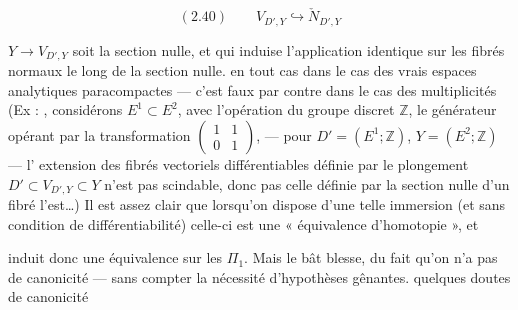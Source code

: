 \documentclass[11pt,a4paper]{article}
\begin{document}
\[
(2.40)\qquad V_{D',Y}\hookrightarrow \check N_{D',Y}
\]

  $Y\to V_{D',Y}$ soit la section nulle, et qui induise l'application identique sur les  fibrés normaux le long de la section nulle.   en tout cas dans le cas des vrais espaces analytiques paracompactes — c'est faux par contre dans le cas des multiplicités (Ex : , considérons $E^1\subset E^2$, avec l'opération du groupe discret $\mathbb Z$,  le générateur opérant par la transformation $\begin{pmatrix}1&1\\0&1\end{pmatrix}$, — pour $D'=(E^1;\mathbb Z)$, $Y=(E^2;\mathbb Z)$ — l' extension des fibrés vectoriels différentiables définie par le plongement $D'\subset V_{D',Y}\subset Y$ n'est pas scindable, donc pas celle définie par la section nulle d'un fibré l'est\ldots) Il est assez clair que lorsqu'on dispose d'une telle immersion  (et sans condition de différentiabilité) celle-ci est une « équivalence d'homotopie », et

induit donc une équivalence sur les $\Pi_1$. Mais le bât blesse, du fait qu'on n'a pas de canonicité — sans compter la nécessité d'hypothèses  gênantes.  quelques doutes de canonicité \ill{}


\end{document}

